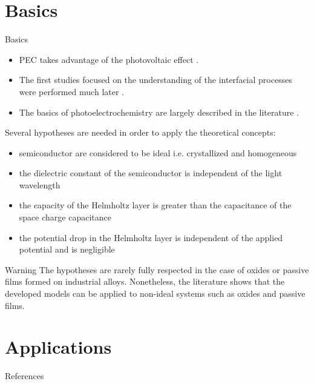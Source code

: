 \documentclass[10pt,compress]{beamer}
\begin{document}
\section{Basics}
    \begin{frame}{Basics}

    \begin{itemize}
        \item PEC takes advantage of the photovoltaic effect \citet{becquerel1839}.
        \item The first studies focused on the understanding of the interfacial processes were performed much later 
              \citep{stimming1986,gerischer1966,copeland1942}.
        \item The basics of photoelectrochemistry are largely described in the literature 
              \citep{morrison1980,gerischer1985,memming2008,marcus2006,bard2002,sato1998}. 
    \end{itemize}
    
    Several hypotheses are needed in order to apply the theoretical concepts:  
    \begin{itemize}
        \item semiconductor are considered to be ideal i.e. crystallized and homogeneous  
        \item the dielectric constant of the semiconductor is independent of the light wavelength  
        \item the capacity of the Helmholtz layer is greater than the capacitance of the space charge capacitance  
        \item the potential drop in the Helmholtz layer is independent of the applied potential and is negligible
    \end{itemize}
    
    \small
    \begin{alertblock}{Warning}
        The hypotheses are rarely fully respected in the case of oxides or passive 
        films formed on industrial alloys. Nonetheless, the literature shows that the 
        developed models can be applied to non-ideal systems such as oxides 
        and passive films.
    \end{alertblock}
    \end{frame}




\section{Applications}

\begin{frame}[allowframebreaks=0.9]{References}
\AtNextBibliography{\tiny}
\nocite{*}
\printbibliography
\end{frame}
\end{document}
